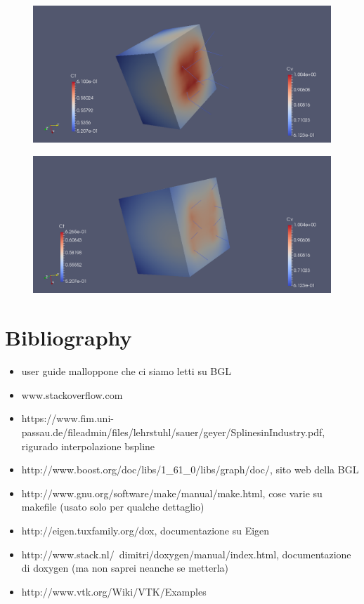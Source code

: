 \documentclass[10pt]{article} %
\begin{document}
	\begin{figure}[!h]
		\centering
		\includegraphics[width=0.92\linewidth]{ct2}
		\label{fig:ct2}
	\end{figure}
	
	\begin{figure}[!h]
		\centering
		\includegraphics[width=0.92\linewidth]{ct3}
		\label{fig:ct3}
	\end{figure}
	\newpage
	\section{Bibliography}
	\begin{itemize}
		\item user guide malloppone che ci siamo letti su BGL
		\item www.stackoverflow.com
		\item https://www.fim.uni-passau.de/fileadmin/files/lehrstuhl/sauer/geyer/SplinesinIndustry.pdf, rigurado interpolazione bspline
		\item http://www.boost.org/doc/libs/1\_61\_0/libs/graph/doc/, sito web della BGL
		\item http://www.gnu.org/software/make/manual/make.html, cose varie su makefile (usato solo per qualche dettaglio)
		\item http://eigen.tuxfamily.org/dox, documentazione su Eigen
		\item http://www.stack.nl/~dimitri/doxygen/manual/index.html, documentazione di doxygen (ma non saprei neanche se metterla)
		\item http://www.vtk.org/Wiki/VTK/Examples
	\end{itemize}
\end{document}
